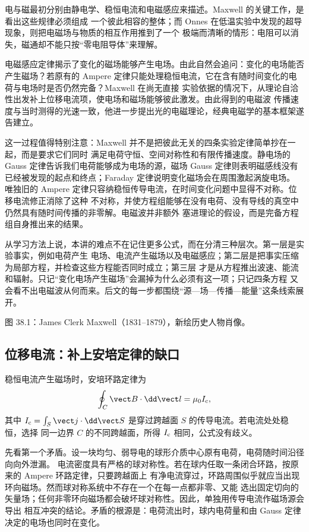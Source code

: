 电与磁最初分别由静电学、稳恒电流和电磁感应来描述。Maxwell 的关键工作，是看出这些规律必须组成
一个彼此相容的整体；而 Onnes 在低温实验中发现的超导现象，则把电磁场与物质的相互作用推到了一个
极端而清晰的情形：电阻可以消失，磁通却不能只按“零电阻导体”来理解。

电磁感应定律揭示了变化的磁场能够产生电场。由此自然会追问：变化的电场能否产生磁场？若原有的
Ampere 定律只能处理稳恒电流，它在含有随时间变化的电荷与电场时是否仍然完备？Maxwell 在尚无直接
实验依据的情况下，从理论自洽性出发补上位移电流项，使电场和磁场能够彼此激发。由此得到的电磁波
传播速度与当时测得的光速一致，他进一步提出光的电磁理论，经典电磁学的基本框架遂告建立。

这一过程值得特别注意：Maxwell 并不是把彼此无关的四条实验定律简单抄在一起，而是要求它们同时
满足电荷守恒、空间对称性和有限传播速度。静电场的 Gauss 定律告诉我们电荷能够成为电场的源，磁场
Gauss 定律则表明磁感线没有已经被发现的起点和终点；Faraday 定律说明变化磁场会在周围激起涡旋电场。
唯独旧的 Ampere 定律只容纳稳恒传导电流，在时间变化问题中显得不对称。位移电流修正消除了这种
不对称，并使方程组能够在没有电荷、没有导线的真空中仍然具有随时间传播的非零解。电磁波并非额外
塞进理论的假设，而是完备方程组自身推出来的结果。

从学习方法上说，本讲的难点不在记住更多公式，而在分清三种层次。第一层是实验事实，例如电荷产生
电场、电流产生磁场以及电磁感应；第二层是把事实压缩为局部方程，并检查这些方程能否同时成立；第三层
才是从方程推出波速、能流和辐射。只记“变化电场产生磁场”会漏掉为什么必须有这一项；只记四条方程
又会看不出电磁波从何而来。后文的每一步都围绕“源—场—传播—能量”这条线索展开。

\maxwellOnnesContext

%
{图 38.1：James Clerk Maxwell（1831--1879），新绘历史人物肖像。}

\subsection*{位移电流：补上安培定律的缺口}

稳恒电流产生磁场时，安培环路定律为
\begin{equation}
  \oint_C\vect B\cdot\dd\vect l=\mu_0 I_{\rm c},
\end{equation}
其中 $I_{\rm c}=\int_S\vect j\cdot\dd\vect S$ 是穿过跨越面 $S$ 的传导电流。若电流处处稳恒，选择
同一边界 $C$ 的不同跨越面，所得 $I_{\rm c}$ 相同，公式没有歧义。

先看第一个矛盾。设一块均匀、弱导电的球形介质中心原有电荷，电荷随时间沿径向向外泄漏。
电流密度具有严格的球对称性。若在球内任取一条闭合环路，按原来的 Ampere 环路定律，只要跨越面上
有净电流穿过，环路周围似乎就应当出现环向磁场。然而球对称系统中不存在一个在每一点都非零、又能
选出固定切向的矢量场；任何非零环向磁场都会破坏球对称性。因此，单独用传导电流作磁场源会导出
相互冲突的结论。矛盾的根源是：电荷流出时，球内电荷量和由 Gauss 定律决定的电场也同时在变化。

